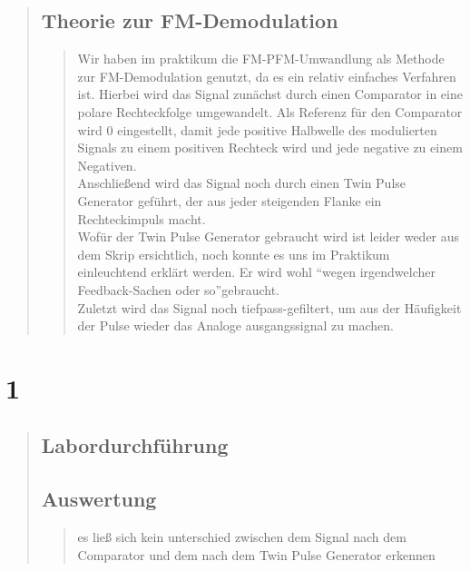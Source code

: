 \begin{quote}
    \subsection{Theorie zur FM-Demodulation}
    \begin{quote}
        Wir haben im praktikum die FM-PFM-Umwandlung als Methode zur FM-Demodulation genutzt, da es ein relativ einfaches
        Verfahren ist. Hierbei wird das Signal zunächst durch einen Comparator in eine polare Rechteckfolge umgewandelt. Als
        Referenz für den Comparator wird \si{0}{\volt} eingestellt, damit jede positive Halbwelle des modulierten Signals zu
        einem positiven Rechteck wird und jede negative zu einem Negativen.\\
        Anschließend wird das Signal noch durch einen Twin Pulse Generator geführt, der aus jeder steigenden Flanke ein
        Rechteckimpuls macht.\\
        Wofür der Twin Pulse Generator gebraucht wird ist leider weder aus dem Skrip ersichtlich, noch konnte es uns im Praktikum
        einleuchtend erklärt werden. Er wird wohl ``wegen irgendwelcher Feedback-Sachen oder so''\footnotemark gebraucht.\\
        Zuletzt wird das Signal noch tiefpass-gefiltert, um aus der Häufigkeit der Pulse wieder das Analoge ausgangssignal zu
        machen.
        
    \end{quote}
    
    
\end{quote}



\section{1}
\begin{quote}
    
    
    \subsection{Labordurchführung}
    \begin{quote}
        
        
    \end{quote}
    
    
    
    
    
    \subsection{Auswertung}
    \begin{quote}
        
        
        
        es ließ sich kein unterschied zwischen dem Signal nach dem Comparator und dem nach dem Twin Pulse Generator erkennen
    \end{quote}
    
\end{quote}


